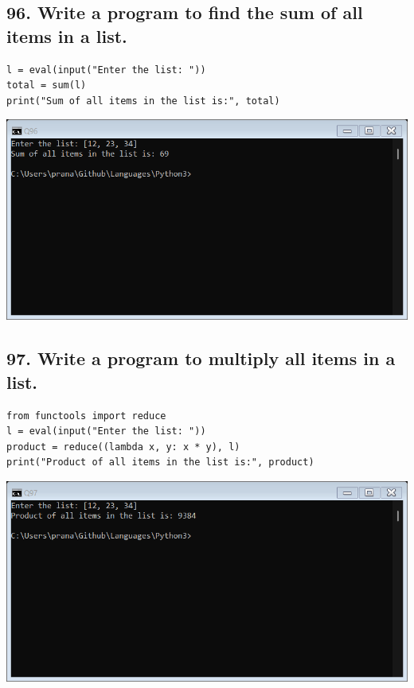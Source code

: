 \documentclass[12pt]{article}
\begin{document}
\subsection*{96. Write a program to find the sum of all items in a list.}
\begin{verbatim}
l = eval(input("Enter the list: "))
total = sum(l)
print("Sum of all items in the list is:", total)
\end{verbatim}
\includegraphics[width=\linewidth]{images/96.png}

\subsection*{97. Write a program to multiply all items in a list.}
\begin{verbatim}
from functools import reduce
l = eval(input("Enter the list: "))
product = reduce((lambda x, y: x * y), l)
print("Product of all items in the list is:", product)
\end{verbatim}
\includegraphics[width=\linewidth]{images/97.png}
\end{document}

